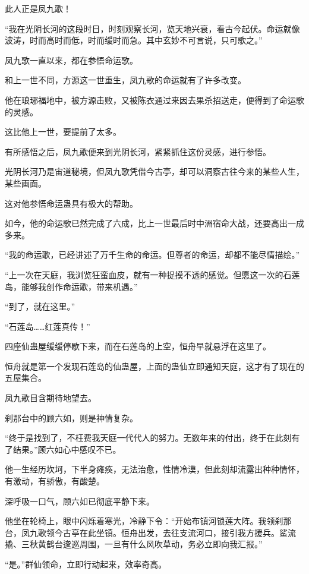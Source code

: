 \begin{this_body}
此人正是凤九歌！

“我在光阴长河的这段时日，时刻观察长河，览天地兴衰，看古今起伏。命运就像波涛，时而高时而低，时而缓时而急。其中玄妙不可言说，只可歌之。”

凤九歌一直以来，都在参悟命运歌。

和上一世不同，方源这一世重生，凤九歌的命运就有了许多改变。

他在琅琊福地中，被方源击败，又被陈衣通过来因去果杀招送走，便得到了命运歌的灵感。

这比他上一世，要提前了太多。

有所感悟之后，凤九歌便来到光阴长河，紧紧抓住这份灵感，进行参悟。

光阴长河乃是宙道秘境，但凤九歌凭借今古亭，却可以洞察古往今来的某些人生，某些画面。

这对他参悟命运蛊具有极大的帮助。

如今，他的命运歌已然完成了六成，比上一世最后时中洲宿命大战，还要高出一成多来。

“我的命运歌，已经讲述了万千生命的命运。但尊者的命运，却都不能尽情描绘。”

“上一次在天庭，我浏览狂蛮血皮，就有一种捉摸不透的感觉。但愿这一次的石莲岛，能够我创作命运歌，带来机遇。”

“到了，就在这里。”

“石莲岛……红莲真传！”

四座仙蛊屋缓缓停歇下来，而在石莲岛的上空，恒舟早就悬浮在这里了。

恒舟就是第一个发现石莲岛的仙蛊屋，上面的蛊仙立即通知天庭，这才有了现在的五屋集合。

凤九歌目含期待地望去。

刹那台中的顾六如，则是神情复杂。

“终于是找到了，不枉费我天庭一代代人的努力。无数年来的付出，终于在此刻有了结果。”顾六如心中感叹不已。

他一生经历坎坷，下半身瘫痪，无法治愈，性情冷漠，但此刻却流露出种种情怀，有激动，有骄傲，有酸楚。

深呼吸一口气，顾六如已彻底平静下来。

他坐在轮椅上，眼中闪烁着寒光，冷静下令：“开始布镇河锁莲大阵。我领刹那台，凤九歌领今古亭在此坐镇。恒舟出发，去往支流河口，接引我方援兵。鲨流撬、三秋黄鹤台逡巡周围，一旦有什么风吹草动，务必立即向我汇报。”

“是。”群仙领命，立即行动起来，效率奇高。

\end{this_body}

